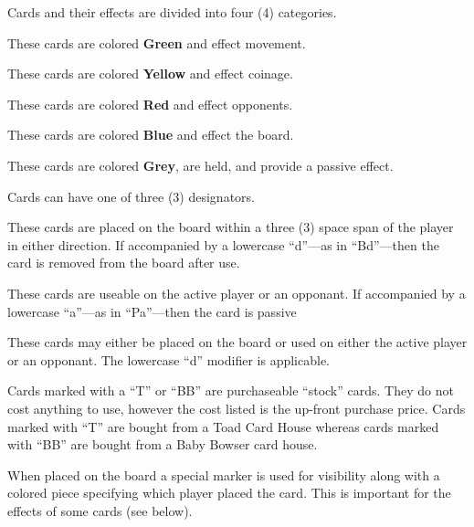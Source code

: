 \documentclass{article}
\begin{document}
\noindent
Cards and their effects are divided into four (4) categories.

\begin{description}[style=nextline]
\item[Movement]
These cards are colored \textbf{Green} and effect movement.

\item[Money]
These cards are colored \textbf{Yellow} and effect coinage.

\item[Attack]
These cards are colored \textbf{Red} and effect opponents.

\item[Board]
These cards are colored \textbf{Blue} and effect the board.

\item[Passive]
These cards are colored \textbf{Grey}, are held, and provide
a passive effect.
\end{description}

\noindent
Cards can have one of three (3) designators.

\begin{description}[style=nextline]
\item[Board (B)]
These cards are placed on the board within a three (3) space span
of the player in either direction.  If accompanied by a lowercase
``d''---as in ``Bd''---then the card is removed from the board after use.

\item[Player (P)]
These cards are useable on the active player or an opponant.
If accompanied by a lowercase ``a''---as in ``Pa''---then the card is passive

\item[Both (S)]
These cards may either be placed on the board or used on either
the active player or an opponant. The lowercase ``d'' modifier is applicable.
\end{description}

\noindent
Cards marked with a ``T'' or ``BB'' are purchaseable ``stock'' cards.
They do not cost anything to use, however the cost listed is the up-front purchase
price.  Cards marked with ``T'' are bought from a Toad Card House whereas cards
marked with ``BB'' are bought from a Baby Bowser card house.
\vspace*{2ex}


\noindent
When placed on the board a special marker is used for visibility along with a
colored piece specifying which player placed the card.  This is important for
the effects of some cards (see below).
\end{document}
